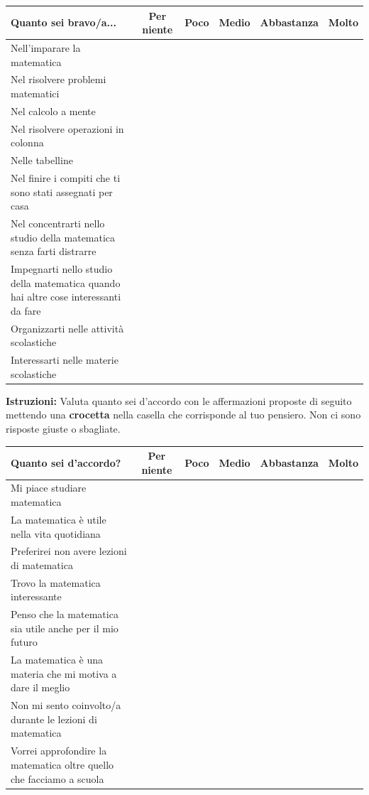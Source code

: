 \documentclass[11pt]{article}
\begin{document}
\noindent
\begin{tabularx}{\textwidth}{|X|c|c|c|c|c|}
  \hline
  \textbf{Quanto sei bravo/a...} & \textbf{\scriptsize Per niente} & \textbf{\scriptsize Poco} & \textbf{\scriptsize Medio} & \textbf{\scriptsize Abbastanza} & \textbf{\scriptsize Molto} \\
  \hline
  Nell'imparare la matematica & & & & & \\
  \hline
  Nel risolvere problemi matematici & & & & & \\
  \hline
  Nel calcolo a mente & & & & & \\
  \hline
  Nel risolvere operazioni in colonna & & & & & \\
  \hline
  Nelle tabelline & & & & & \\
  \hline
  Nel finire i compiti che ti sono stati assegnati per casa & & & & & \\
  \hline 
  Nel concentrarti nello studio della matematica senza farti distrarre & & & & & \\
  \hline
  Impegnarti nello studio della matematica quando hai altre cose interessanti da fare & & & & & \\
  \hline
  Organizzarti nelle attività scolastiche & & & & & \\
  \hline
  Interessarti nelle materie scolastiche & & & & & \\
  \hline
\end{tabularx}

\newpage


\noindent\textbf{Istruzioni:} Valuta quanto sei d'accordo con le affermazioni proposte di seguito mettendo una \textbf{crocetta} nella casella che corrisponde al tuo pensiero. Non ci sono risposte giuste o sbagliate.
\newline

\noindent
\begin{tabularx}{\textwidth}{|X|c|c|c|c|c|}
  \hline
  \textbf{Quanto sei d'accordo?} & \textbf{\scriptsize Per niente} & \textbf{\scriptsize Poco} & \textbf{\scriptsize Medio} & \textbf{\scriptsize Abbastanza} & \textbf{\scriptsize Molto} \\
  \hline
  Mi piace studiare matematica & & & & & \\
  \hline
  La matematica è utile nella vita quotidiana & & & & & \\
  \hline
  Preferirei non avere lezioni di matematica & & & & & \\
  \hline
  Trovo la matematica interessante & & & & & \\
  \hline
  Penso che la matematica sia utile anche per il mio futuro & & & & & \\
  \hline
  La matematica è una materia che mi motiva a dare il meglio & & & & & \\
  \hline 
  Non mi sento coinvolto/a durante le lezioni di matematica & & & & & \\
  \hline
  Vorrei approfondire la matematica oltre quello che facciamo a scuola & & & & & \\
  \hline
\end{tabularx}
\end{document}
